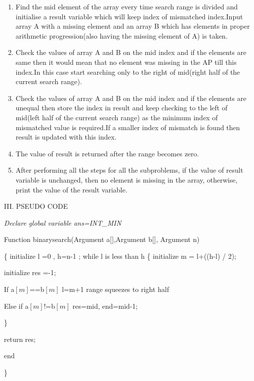 \documentclass[12pt,a4paper]{article}
\begin{document}
\begin{multicols}{2}
\begin{enumerate}
\item Find the mid element of the array every time search range is divided and initialise a result variable which will keep index of mismatched index.Input array A with a missing element and an array B which has elements in proper arithmetic progression(also having the missing element of A) is taken.
\item Check the values of array A and B on the mid index and if the elements are same then it would mean that no element was missing in the AP till this index.In this case start searching only to the right of mid(right half of the current search range).
\item Check the values of array A and B on the mid index and if the elements are unequal then store the index in result and keep checking to the left of mid(left half of the current search range) as the minimum index of mismatched value is required.If a smaller index of mismatch is found then result is updated with this index.
\item The value of result is returned after the range becomes zero.
\item After performing all the steps for all the subproblems, if the value of result variable is unchanged, then no element is missing in the array, otherwise, print the value of the result variable.
\setcounter{numberedCntA}{\theenumi}
\end{enumerate}




\begin{center}III. PSEUDO CODE\end{center}

\textit{ Declare global variable ans=INT\_MIN}

Function binarysearch(Argument a$[$$]$,Argument b$[$$]$, Argument n) 


\{ 
\quad initialize l =0 , h=n-1 ;
\quad  while l is less than h 
\{
\quad initialize m = l+((h-l) / 2);

\quad initialize res =-1;



\quad If a$[m]$==b$[m]$ l=m+1 range squeezes to right half


\quad Else if a$[m]$!=b$[m]$  res=mid, end=mid-1;


\}
 

\quad return res; 

end

\} 


\end{multicols}
\end{document}
